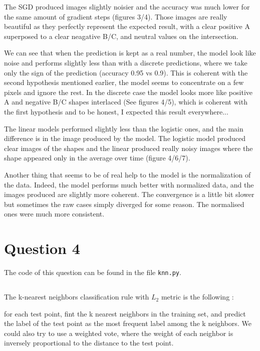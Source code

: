 \documentclass{article}
\begin{document}
The SGD produced images slightly noisier and the accuracy was much lower for the same amount of gradient steps (figures 3/4). Those images are really beautiful as they perfectly represent the expected result, with a clear positive A superposed to a clear neagative B/C, and neutral values on the intersection.\newline

We can see that when the prediction is kept as a real number, the model look like noise and performs slightly less than with a discrete predictions, where we take only the sign of the prediction (accuracy 0.95 vs 0.9).
This is coherent with the second hypothesis mentioned earlier, the model seems to concentrate on a few pixels and ignore the rest.
In the discrete case the model looks more like positive A and negative B/C shapes interlaced (See figures 4/5), which is coherent with the first hypothesis and to be honest, I expected this result everywhere...

The linear models performed slightly less than the logistic ones, and the main difference is in the image produced by the model. The logistic model produced clear images of the shapes and the linear produced really noisy images where the shape appeared only in the average over time (figure 4/6/7).

Another thing that seems to be of real help to the model is the normalization of the data. Indeed, the model performs much better with normalized data, and the images produced are slightly more coherent.
The convergence is a little bit slower but sometimes the raw cases simply diverged for some reason. The normalised ones were much more consistent.

\section{Question 4}

The code of this question can be found in the file \texttt{knn.py}.\newline

\subsection{}

The k-nearest neighbors classification rule with $L_2$ metric is the following :

for each test point, fint the k nearest neighbors in the training set, and predict the label of the test point as the most frequent label among the k neighbors.
We could also try to use a weighted vote, where the weight of each neighbor is inversely proportional to the distance to the test point.\newline
\end{document}
